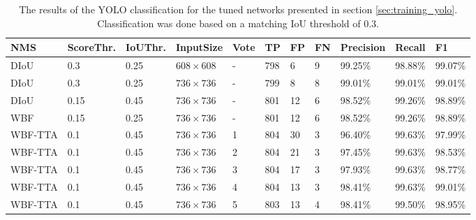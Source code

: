 \begin{table}[H]
\footnotesize
\begin{center}
\begin{tabular}{|l|l|l|l|l|l|l|l|l|l|l|}

\hline
\textbf{NMS} & \textbf{ScoreThr.} & \textbf{IoUThr.} & \textbf{InputSize} & \textbf{Vote} & \textbf{TP}  & \textbf{FP} & \textbf{FN} & \textbf{Precision} & \textbf{Recall}  & \textbf{F1}       \\
\hline
DIoU    & 0.3        & 0.25     & $608 \times 608$   & -     & 798 & 6  & 9  & 99.25\%   & 98.88\% & 99.07\%  \\
\hline
DIoU    & 0.3        & 0.25     & $736  \times 736$      & -     & 799 & 8  & 8  & 99.01\%   & 99.01\% & 99.01\%  \\
\hline
DIoU    & 0.15       & 0.45     & $736  \times 736$     & -     & 801 & 12 & 6  & 98.52\%   & 99.26\% & 98.89\%  \\
\hline
WBF     & 0.15       & 0.25     & $736  \times 736$      & -     & 801 & 12 & 6  & 98.52\%   & 99.26\% & 98.89\%  \\
\hline
WBF-TTA & 0.1        & 0.45     & $736  \times 736$      & 1     & 804 & 30 & 3  & 96.40\%   & 99.63\% & 97.99\%  \\
\hline
WBF-TTA & 0.1        & 0.45     & $736  \times 736$        & 2     & 804 & 21 & 3  & 97.45\%   & 99.63\% & 98.53\%  \\
\hline
WBF-TTA & 0.1        & 0.45     & $736  \times 736$        & 3     & 804 & 17 & 3  & 97.93\%   & 99.63\% & 98.77\%  \\
\hline
WBF-TTA & 0.1        & 0.45     & $736  \times 736$        & 4     & 804 & 13 & 3  & 98.41\%   & 99.63\% & 99.01\%  \\
\hline
WBF-TTA & 0.1        & 0.45     & $736  \times 736$        & 5     & 803 & 13 & 4  & 98.41\%   & 99.50\% & 98.95\%  \\
\hline

\end{tabular}
\caption{The results of the YOLO classification for the tuned networks presented in section \ref{sec:training_yolo}. Classification was done based on a matching \ac{IoU} threshold of 0.3.}
\label{tab:yolo_classification_res}
\end{center}
\end{table}

